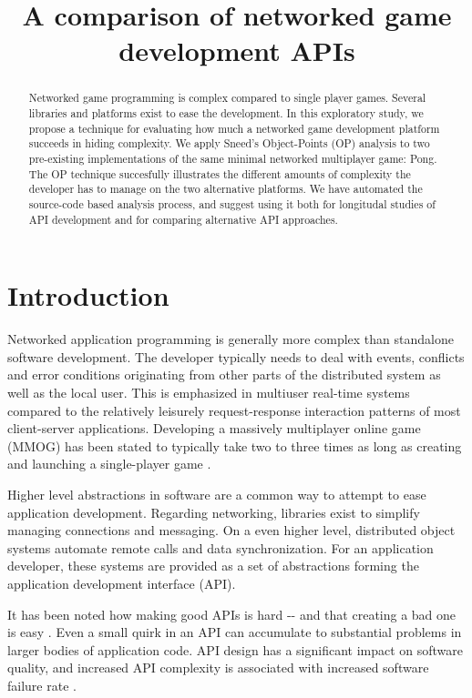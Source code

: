 \documentclass[conference]{IEEEtran}
\title{\phantomsection%
  A comparison of networked game development APIs%
  \label{a-comparison-of-networked-game-development-apis}}
\author{}
\date{}
\begin{document}
\maketitle
\begin{abstract}
Networked game programming is complex compared to single
player games. Several libraries and platforms exist to ease the
development. In this exploratory study, we propose a technique for
evaluating how much a networked game development platform succeeds
in hiding complexity. We apply Sneed's Object-Points (OP) analysis
to two pre-existing implementations of the same minimal networked
multiplayer game: Pong. The OP technique succesfully illustrates
the different amounts of complexity the developer has to manage on
the two alternative platforms. We have automated the source-code
based analysis process, and suggest using it both for longitudal
studies of API development and for comparing alternative API
approaches.
\end{abstract}


\section{Introduction%
  \label{introduction}%
}

Networked application programming is generally more complex than
standalone software development. The developer typically needs to deal
with events, conflicts and error conditions originating from other
parts of the distributed system as well as the local user. This is
emphasized in multiuser real-time systems compared to the relatively
leisurely request-response interaction patterns of most client-server
applications. Developing a massively multiplayer online game (MMOG)
has been stated to typically take two to three times as long as
creating and launching a single-player game \cite{middleware}.

Higher level abstractions in software are a common way to attempt to
ease application development. Regarding networking, libraries exist to
simplify managing connections and messaging. On a even higher level,
distributed object systems automate remote calls and data
synchronization. For an application developer, these systems are
provided as a set of abstractions forming the application development
interface (API).

It has been noted how making good APIs is hard -{}- and that creating a
bad one is easy \cite{api-matters}. Even a small quirk in an API can
accumulate to substantial problems in larger bodies of application
code. API design has a significant impact on software quality, and
increased API complexity is associated with increased software failure
rate \cite{cmu-api_failures}.
\end{document}
